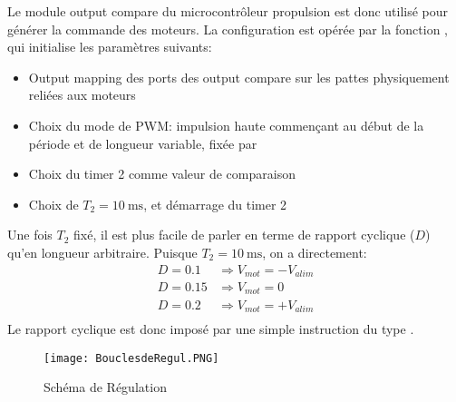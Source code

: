 Le module output compare du microcontrôleur propulsion est donc utilisé pour générer la commande des moteurs. La configuration est opérée par la fonction , qui initialise les paramètres suivants:
\begin{itemize}
  \item Output mapping des ports des output compare sur les pattes physiquement reliées aux moteurs
  \item Choix du mode de PWM: impulsion haute commençant au début de la période et de longueur variable, fixée par 
  \item Choix du timer 2 comme valeur de comparaison
  \item Choix de $T_2 = \SI{10}{\milli\second}$, et démarrage du timer 2
\end{itemize}
Une fois $T_2$ fixé, il est plus facile de parler en terme de rapport cyclique ($D$) qu'en longueur arbitraire. Puisque $T_2 = \SI{10}{\milli\second}$, on a directement:
\begin{align*}
  D = 0.1 &\Rightarrow V_{mot} = -V_{alim}\\
  D = 0.15 &\Rightarrow V_{mot} = 0\\
  D = 0.2 &\Rightarrow V_{mot} = +V_{alim}\\
\end{align*}
Le rapport cyclique est donc imposé par une simple instruction du type .

\begin{figure}[tbph]
\centering
\texttt{[image: BouclesdeRegul.PNG]}
\caption{\label{fig:BouclesdeRegul}Schéma de Régulation}
\end{figure}

